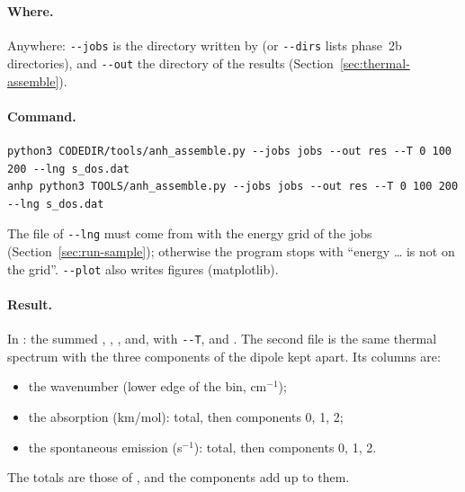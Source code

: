 \section{}\label{sec:run-assemble}

\paragraph{Where.} Anywhere: \texttt{-{}-jobs} is the directory written by
 (or \texttt{-{}-dirs} lists phase~2b directories), and
\texttt{-{}-out} the directory of the results
(Section~\ref{sec:thermal-assemble}).

\paragraph{Command.}
\begin{lstlisting}
python3 CODEDIR/tools/anh_assemble.py --jobs jobs --out res --T 0 100 200 --lng s_dos.dat
anhp python3 TOOLS/anh_assemble.py --jobs jobs --out res --T 0 100 200 --lng s_dos.dat
\end{lstlisting}
The file of \texttt{-{}-lng} must come from  with the
energy grid of the jobs (Section~\ref{sec:run-sample}); otherwise the
program stops with ``energy \ldots{} is not on the grid''. \texttt{-{}-plot}
also writes figures (matplotlib).

\paragraph{Result.} In : the summed ,
, , and,
with \texttt{-{}-T},  and
. The second file is the same thermal
spectrum with the three components of the dipole kept apart. Its columns
are:
\begin{itemize}
\item the wavenumber (lower edge of the bin, cm$^{-1}$);
\item the absorption (km/mol): total, then components 0, 1, 2;
\item the spontaneous emission (s$^{-1}$): total, then components 0, 1, 2.
\end{itemize}
The totals are those of , and the components add
up to them.

